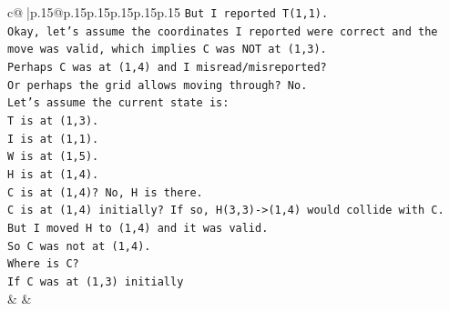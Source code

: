 \documentclass{article}
\begin{document}
{\begin{supertabular}{c@{$\;$}|p{.15\linewidth}@{}p{.15\linewidth}p{.15\linewidth}p{.15\linewidth}p{.15\linewidth}p{.15\linewidth}}
{{{\texttt{But I reported T(1,1).} \\
\texttt{Okay, let's assume the coordinates I reported were correct and the move was valid, which implies C was NOT at (1,3).} \\
\texttt{Perhaps C was at (1,4) and I misread/misreported?} \\
\texttt{Or perhaps the grid allows moving through? No.} \\
\texttt{Let's assume the current state is:} \\
\texttt{T is at (1,3).} \\
\texttt{I is at (1,1).} \\
\texttt{W is at (1,5).} \\
\texttt{H is at (1,4).} \\
\texttt{C is at (1,4)? No, H is there.} \\
\texttt{C is at (1,4) initially? If so, H(3,3){-}>(1,4) would collide with C.} \\
\texttt{But I moved H to (1,4) and it was valid.} \\
\texttt{So C was not at (1,4).} \\
\texttt{Where is C?} \\
\texttt{If C was at (1,3) initially} \\
            }
        }
    }
    & & \\ \\


\end{supertabular}}
\end{document}
